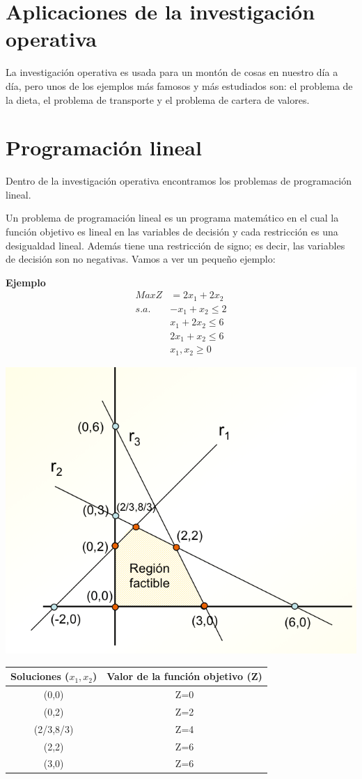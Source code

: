 \documentclass{article}
\begin{document}
\section{Aplicaciones de la investigación operativa}
La investigación operativa es usada para un montón de cosas en nuestro día a día, pero unos de los ejemplos más famosos y más estudiados son: el problema de la dieta, el problema de transporte y el problema de cartera de valores.

\section{Programación lineal}
Dentro de la investigación operativa encontramos los problemas de programación lineal. \cite{Rios-InsuaS.MateosA.BielzaM.C.yJimenez2004}

Un problema de programación lineal es un programa matemático en el cual la función objetivo es lineal en las variables de decisión y cada restricción es una desigualdad lineal. Además tiene una restricción de signo; es decir, las variables de decisión son no negativas. Vamos a ver un pequeño ejemplo:

\textbf{Ejemplo} \cite{GobernaM.A.JornetV.Puente2004}
\begin{equation}
\begin{split}
MaxZ&=2x_1+2x_2\\
s.a.~&-x_1+x_2\leq 2\\
&x_1+2x_2\leq 6\\
&2x_1+x_2\leq 6\\
&x_1,x_2\geq 0
\end{split}
\end{equation}
\begin{center}
\includegraphics[width=.70\textwidth]{ej_grafi.png} \\
\end{center}

\begin{center}
\begin{tabular}{ c | c }
Soluciones ($x_1,x_2$)  & Valor de la función objetivo (Z) \\ \hline 
(0,0) & Z=0 \\
(0,2) & Z=2 \\
(2/3,8/3) & Z=4 \\
(2,2) & Z=6 \\
(3,0) & Z=6
\end{tabular}
\end{center}



\end{document}
